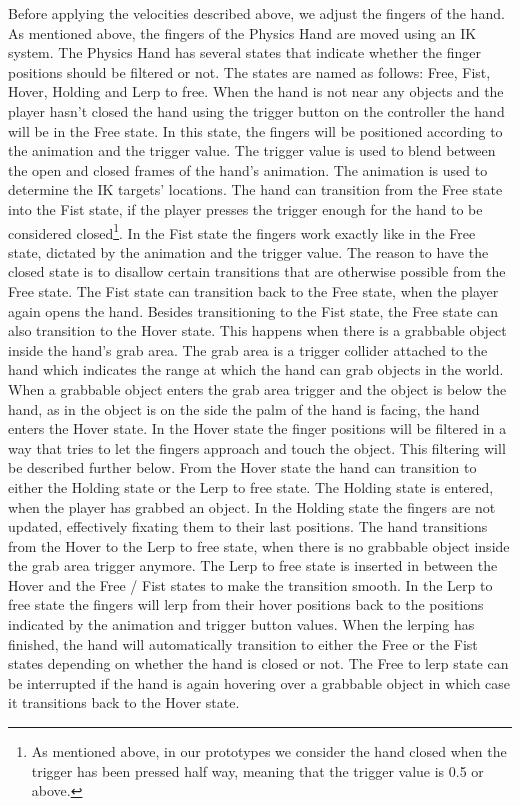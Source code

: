 Before applying the velocities described above, we adjust the fingers of the hand. As mentioned above, the fingers of the Physics Hand are moved using an IK system. The Physics Hand has several states that indicate whether the finger positions should be filtered or not. The states are named as follows: Free, Fist, Hover, Holding and Lerp to free. When the hand is not near any objects and the player hasn't closed the hand using the trigger button on the controller the hand will be in the Free state. In this state, the fingers will be positioned according to the animation and the trigger value. The trigger value is used to blend between the open and closed frames of the hand's animation. The animation is used to determine the IK targets' locations. The hand can transition from the Free state into the Fist state, if the player presses the trigger enough for the hand to be considered closed\footnote{As mentioned above, in our prototypes we consider the hand closed when the trigger has been pressed half way, meaning that the trigger value is 0.5 or above.}. In the Fist state the fingers work exactly like in the Free state, dictated by the animation and the trigger value. The reason to have the closed state is to disallow certain transitions that are otherwise possible from the Free state. The Fist state can transition back to the Free state, when the player again opens the hand. Besides transitioning to the Fist state, the Free state can also transition to the Hover state. This happens when there is a grabbable object inside the hand's grab area. The grab area is a trigger collider attached to the hand which indicates the range at which the hand can grab objects in the world. When a grabbable object enters the grab area trigger and the object is below the hand, as in the object is on the side the palm of the hand is facing, the hand enters the Hover state. In the Hover state the finger positions will be filtered in a way that tries to let the fingers approach and touch the object. This filtering will be described further below. From the Hover state the hand can transition to either the Holding state or the Lerp to free state. The Holding state is entered, when the player has grabbed an object. In the Holding state the fingers are not updated, effectively fixating them to their last positions. The hand transitions from the Hover to the Lerp to free state, when there is no grabbable object inside the grab area trigger anymore. The Lerp to free state is inserted in between the Hover and the Free / Fist states to make the transition smooth. In the Lerp to free state the fingers will lerp from their hover positions back to the positions indicated by the animation and trigger button values. When the lerping has finished, the hand will automatically transition to either the Free or the Fist states depending on whether the hand is closed or not. The Free to lerp state can be interrupted if the hand is again hovering over a grabbable object in which case it transitions back to the Hover state.

